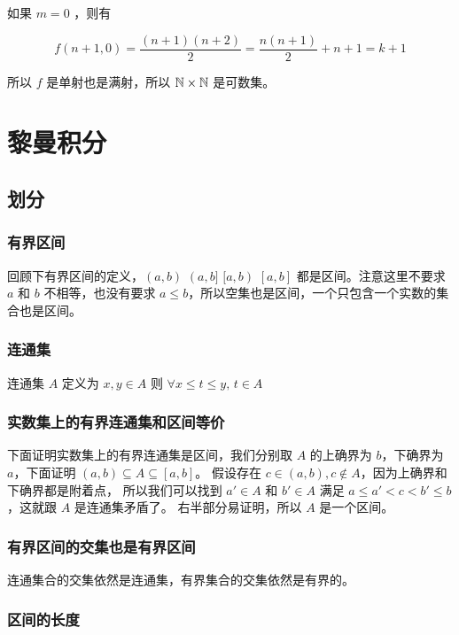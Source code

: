 如果 $m = 0$ ，则有

\[
f(n+1, 0) = \frac{(n+1)(n+2)}{2} = \frac{n(n+1)}{2} + n + 1 = k + 1
\]

所以 $f$ 是单射也是满射，所以 $\mathbb{N} \times \mathbb{N}$ 是可数集。

\section{黎曼积分}

\subsection{划分}

\subsubsection{有界区间}

回顾下有界区间的定义，$(a,b) \,\, (a,b] \,\, [a,b) \,\, [a,b]$ 都是区间。注意这里不要求 $a$ 和 $b$ 不相等，也没有要求 $a \le b$，所以空集也是区间，一个只包含一个实数的集合也是区间。

\subsubsection{连通集}

连通集 $A$ 定义为 $x, y \in A$ 则 $\forall x \le t \le y, \, t \in A$ 

\subsubsection{实数集上的有界连通集和区间等价}

下面证明实数集上的有界连通集是区间，我们分别取 $A$ 的上确界为 $b$，下确界为 $a$，下面证明 $(a,b) \subseteq A \subseteq [a,b]$。
假设存在 $c \in (a,b), c \notin A$，因为上确界和下确界都是附着点，
所以我们可以找到 $a' \in A $ 和 $b' \in A$ 满足 $a \le a' < c < b' \le b$，这就跟 $A$ 是连通集矛盾了。
右半部分易证明，所以 $A$ 是一个区间。

\subsubsection{有界区间的交集也是有界区间}

连通集合的交集依然是连通集，有界集合的交集依然是有界的。


\subsubsection{区间的长度}

